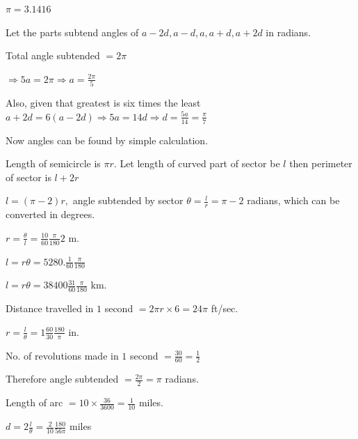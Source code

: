     $\pi = 3.1416$

\item Let the parts subtend angles of $a - 2d, a - d, a, a + d, a + 2d$ in radians.

    Total angle subtended $= 2\pi$

    $\Rightarrow 5a = 2\pi \Rightarrow a = \frac{2\pi}{5}$

    Also, given that greatest is six times the least $a + 2d = 6(a - 2d) \Rightarrow 5a = 14d \Rightarrow d = \frac{5a}{14} =
    \frac{\pi}{7}$

    Now angles can be found by simple calculation.

\item Length of semicircle is $\pi r$. Let length of curved part of sector be $l$ then perimeter of sector is $l +
    2r$

    $l = (\pi - 2)r,$ angle subtended by sector $\theta = \frac{l}{r} = \pi - 2$ radians, which can be converted in
    degrees.

\item $r = \frac{\theta}{l} = \frac{10}{60}\frac{\pi}{180}2$ m.

\item $l = r\theta = 5280.\frac{1}{60}\frac{\pi}{180}$

\item $l = r\theta = 38400\frac{31}{60}\frac{\pi}{180}$ km.

\item Distance travelled in $1$ second $= 2\pi r \times 6 = 24\pi$ ft/sec.

\item $r = \frac{l}{\theta} = 1\frac{60}{30}\frac{180}{\pi}$ in.

\item No. of revolutions made in $1$ second $= \frac{30}{60} = \frac{1}{2}$

    Therefore angle subtended $= \frac{2\pi}{2} = \pi$ radians.

\item Length of arc $= 10 \times \frac{36}{3600} = \frac{1}{10}$ miles.

    $d = 2\frac{l}{\theta} = \frac{2}{10}\frac{180}{56\pi}$ miles
\stopitemize

